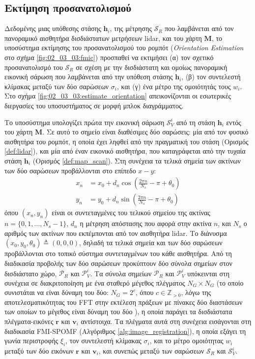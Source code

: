 \subsection{Εκτίμηση προσανατολισμού}
\label{subsection:02_03_03:02}

Δεδομένης μιας υπόθεσης στάσης $\bm{h}_i$, της μέτρησης $\mathcal{S}_R$ που
λαμβάνεται από τον πανοραμικό αισθητήρα δισδιάστατων μετρήσεων lidar, και του
χάρτη $\bm{M}$, το υποσύστημα εκτίμησης του προσανατολισμού του ρομπότ
(\textit{Orientation Estimation} στο σχήμα \ref{fig:02_03_03:fmic}) προσπαθεί να
εκτιμήσει (α) τον σχετικό προσανατολισμό του $\mathcal{S}_R$ σε σχέση με την
δισδιάστατη και ομοίως πανοραμική εικονική σάρωση που λαμβάνεται από την
υπόθεση στάσης $\bm{h}_i$, (β) τον συντελεστή κλίμακας μεταξύ των δύο σαρώσεων
$\sigma_i$, και (γ) ένα μέτρο της ομοιότητάς τους $w_i$.  Στο σχήμα
\ref{fig:02_03_03:estimate_orientation} απεικονίζονται οι εσωτερικές διεργασίες
του υποσυστήματος σε μορφή μπλοκ διαγράμματος.

Το υποσύστημα υπολογίζει πρώτα την εικονική σάρωση $\mathcal{S}_V^i$ από τη
στάση $\bm{h}_i$ εντός του χάρτη $\bm{M}$. Σε αυτό το σημείο είναι διαθέσιμες
δύο σαρώσεις: μία από τον φυσικό αισθητήρα του ρομπότ, η οποία έχει ληφθεί από
την πραγματική του στάση (Ορισμός \ref{def:lidar}), και μία από έναν εικονικό
αισθητήρα, που καταγράφεται από την τυχαία στάση $\bm{h}_i$ (Ορισμός
\ref{def:map_scan}). Στη συνέχεια τα τελικά σημεία των ακτίνων των δύο σαρώσεων
προβάλλονται στο επίπεδο $x-y$:
\begin{align}
  x_n &= x_0 + d_n \cos(\frac{2 \pi n}{N_s} - \pi + \theta_0) \label{eq:point_projection_x} \\
  y_n &= y_0 + d_n \sin(\frac{2 \pi n}{N_s} - \pi + \theta_0) \label{eq:point_projection_y}
\end{align}
όπου $(x_n,y_n)$ είναι οι συντεταγμένες του τελικού σημείου της ακτίνας $n
= \{0,1,\dots, N_s-1\}$, $d_n$ η μέτρηση απόστασης που αφορά στην ακτίνα $n$,
και $N_s$ ο αριθμός των ακτίνων που εκπέμπονται από τον αισθητήρα lidar.  Το
διάνυσμα $(x_0,y_0,\theta_0) \triangleq (0,0,0)$, δηλαδή τα τελικά σημεία και
των δύο σαρώσεων προβάλλονται στο τοπικό σύστημα συντεταγμένων του κάθε
αισθητήρα.  Από τη διαδικασία προβολής των δύο σαρώσεων προκύπτουν δύο σύνολα
σημείων στον δισδιάστατο χώρο, $\mathcal{P}_R$ και $\mathcal{P}_V^i$.  Τα
σύνολα σημείων $\mathcal{P}_R$ και $\mathcal{P}_V^i$ υπόκεινται στη συνέχεια σε
διακριτοποίηση με ένα σταθερό μέγεθος πλέγματος $N_G \times N_G$ (το οποίο
συνιστάται να είναι δύναμη του δύο: $N_G = 2^c$, όπου $c \in \mathbb{Z}_{>0}$,
λόγω της αποτελεσματικότητας του FFT στην εκτέλεση πράξεων με πίνακες δύο
διαστάσεων των οποίων το μέγεθος είναι δύναμη του δύο \cite{Bulow2010}), η
οποία παράγει τα δισδιάστατα πλέγματα-εικόνες $\bm{r}$ και $\bm{v}_i$
αντίστοιχα. Τα πλέγματα αυτά στη συνέχεια εισάγονται στη διαδικασία FMI-SPOMF
(Αλγόριθμος \ref{alg:image_registration}), η οποία εξάγει τη γωνία περιστροφής
$\xi_i$, τον συντελεστή κλίμακας $\sigma_i$, και το μέτρο ομοιότητας $w_i$
μεταξύ των δύο εικόνων $\bm{r}$ και $\bm{v}_i$, και συνεπώς μεταξύ των σαρώσεων
$\mathcal{S}_R$ και $\mathcal{S}_V^i$.


